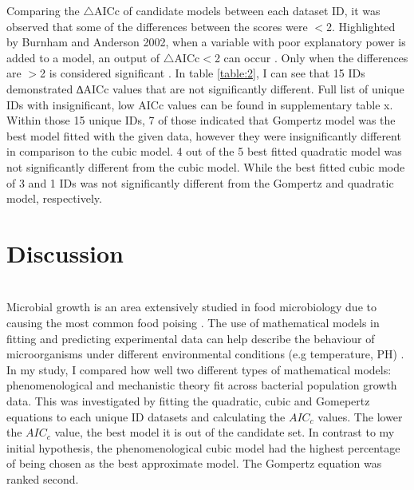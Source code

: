 \documentclass[11pt]{article}
\begin{document}
Comparing the $\triangle$AICc of candidate models between each dataset ID, it was observed that some of the differences between the scores were $<$2. Highlighted
by Burnham and Anderson 2002, when a variable with poor explanatory power is added to a model, an output 
of $\triangle$AICc$<$2 can occur \cite{burnham_basic_2002,arnold_uninformative_2010}. Only when the differences are $>$2 is considered significant \cite{wyss_seismicity_2012}. In table \ref{table:2}, I can see that 15 IDs demonstrated ∆AICc values
that are not significantly different. Full list of unique IDs with insignificant, low AICc values can be found in supplementary table x. Within those 15
unique IDs, 7 of those indicated that Gompertz model was the best model fitted with the given data, however they were insignificantly different in comparison
to the cubic model. 4 out of the 5 best fitted quadratic model was not significantly different from the cubic model. While the best fitted cubic mode of 3 and
1 IDs was not significantly different from the Gompertz and quadratic model, respectively.

\section{Discussion}\\

Microbial growth is an area extensively studied in food microbiology due to causing the most common food poising \cite{buchanan_when_1997,xiong_comparison_1999}. The use of mathematical models
in fitting and predicting experimental data can help describe the behaviour of microorganisms under different environmental conditions (e.g temperature, PH) \cite{zwietering_modeling_1990}.
In my study, I compared how well two different types of mathematical models: phenomenological and mechanistic theory fit across bacterial population
growth data. This was investigated by fitting the quadratic, cubic and Gomepertz equations to each unique ID datasets and calculating the $AIC_{c}$ values. 
The lower the $AIC_{c}$ value, the best model it is out of the candidate set. In contrast to my initial hypothesis, the phenomenological cubic model 
had the highest percentage of being chosen as the best approximate model. The Gompertz equation was ranked second.  
\end{document}
